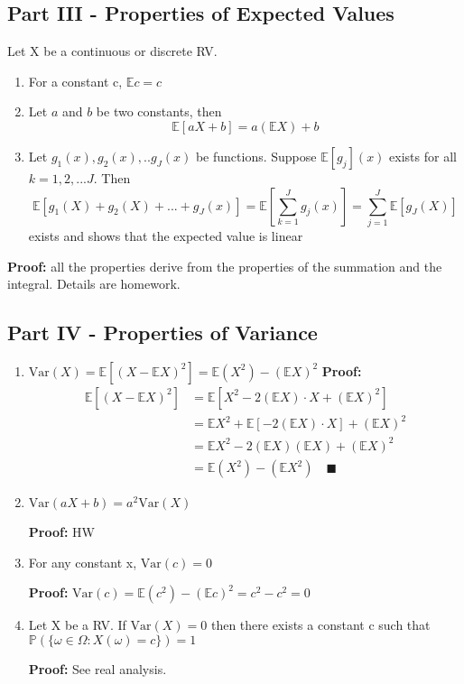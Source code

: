 \documentclass[12pt]{article}
\renewcommand{\P}{\mathbb{P}}
\newcommand{\E}{\mathbb{E}}
\begin{document}
\subsection*{Part III - Properties of Expected Values}
Let X be a continuous or discrete RV. 
\begin{enumerate}
    \item For a constant c, $\mathbb{E}c = c$
    \item Let $a$ and $b$ be two constants, then 
    \[\mathbb{E}[aX + b] = a(\mathbb{E}X)+ b\]
    \item Let $g_1(x), g_2(x), .. g_J(x)$ be functions. Suppose $\mathbb{E}[g_j](x)$ exists for all $k = 1, 2, ... J$. Then 
    \[\mathbb{E}[g_1(X) + g_2(X) + ... + g_J(x)] = \mathbb{E}[\sum_{k=1}^J g_j(x)] = \sum_{j=1}^J \mathbb{E}[g_J(X)]\]
    exists and shows that the expected value is linear 
\end{enumerate}

\textbf{Proof:} all the properties derive from the properties of the summation and the integral. Details are homework.

\subsection*{Part IV - Properties of Variance}
\begin{enumerate}
    \item $\text{Var}(X) = \mathbb{E}[(X- \mathbb{E}X)^2] = \mathbb{E}(X^2) - (\mathbb{E}X)^2$
    \textbf{Proof:} 
    \begin{align*}
        \mathbb{E}[(X- \mathbb{E}X)^2] &= \mathbb{E}[X^2 - 2(\mathbb{E}X)\cdot X + (\mathbb{E}X)^2]\\
        &= \E X^2 + \E[-2(\E X) \cdot X] + (\E X)^2 \\
        &= \E X^2 - 2(\E X)(\E X)  + (\E X)^2 \\
        &= \E(X^2) - (\E X^2) \quad \blacksquare
    \end{align*}

    \item $\text{Var}(aX + b) = a^2 \text{Var}(X)$
    
    \textbf{Proof:} HW 
    \item For any constant x, $\text{Var}(c) = 0$
    
    \textbf{Proof:} $\text{Var}(c) = \E(c^2) - (\E c)^2 = c^2 - c^2 = 0$

    \item Let X be a RV. If $\text{Var}(X) = 0$ then there exists a constant c such that $\P(\{\omega \in \Omega : X(\omega) = c\}) = 1$
    
    \textbf{Proof:} See real analysis.
\end{enumerate}
\end{document}
